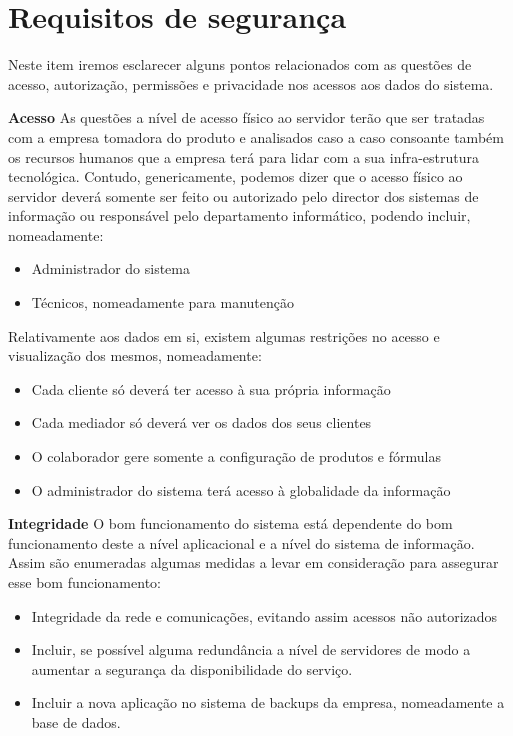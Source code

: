 \section{Requisitos de segurança}
Neste item iremos esclarecer alguns pontos relacionados com as questões de acesso, autorização, permissões e privacidade nos acessos aos dados do sistema. 

\textbf{Acesso}
As questões a nível de acesso físico ao servidor terão que ser tratadas com a empresa tomadora do produto e analisados caso a caso consoante também os recursos humanos que a empresa terá para lidar com a sua infra-estrutura tecnológica.
Contudo, genericamente, podemos dizer que o acesso físico ao servidor deverá somente ser feito ou autorizado pelo director dos sistemas de informação ou responsável pelo departamento informático, podendo incluir, nomeadamente:

\begin{itemize}
\item Administrador do sistema
\item Técnicos, nomeadamente para manutenção
\end{itemize}

Relativamente aos dados em si, existem algumas restrições no acesso e visualização dos mesmos, nomeadamente:
\begin{itemize}
\item Cada cliente só deverá ter acesso à sua própria informação
\item Cada mediador só deverá ver os dados dos seus clientes
\item O colaborador gere somente a configuração de produtos e fórmulas
\item O administrador do sistema terá acesso à globalidade da informação
\end{itemize}

\textbf{Integridade}
O bom funcionamento do sistema está dependente do bom funcionamento deste a nível aplicacional e a nível do sistema de informação. Assim são enumeradas algumas medidas a levar em consideração para assegurar esse bom funcionamento:
\begin{itemize}
\item Integridade da rede e comunicações, evitando assim acessos não autorizados
\item Incluir, se possível alguma redundância a nível de servidores de modo a aumentar a segurança da disponibilidade do serviço.
\item Incluir a nova aplicação no sistema de backups da empresa, nomeadamente a base de dados.
\end {itemize}

